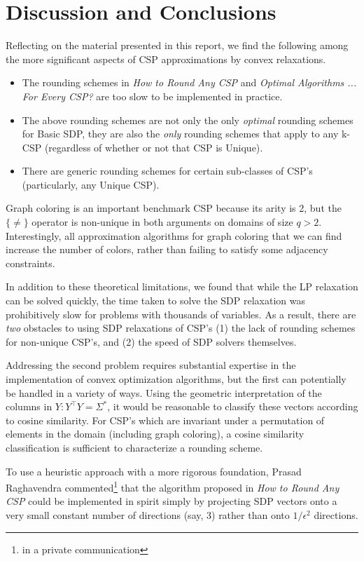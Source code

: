 \section{Discussion and Conclusions}	
	Reflecting on the material presented in this report, we find the following among the more significant aspects of CSP approximations by convex relaxations.
\begin{itemize}
\item The rounding schemes in \textit{How to Round Any CSP} and \textit{Optimal Algorithms ... For Every CSP?} are too slow to be implemented in practice.
\item The above rounding schemes are not only the only \textit{optimal} rounding schemes for Basic SDP, they are also the \textit{only} rounding schemes that apply to any k-CSP (regardless of whether or not that CSP is Unique).
\item There are generic rounding schemes for certain sub-classes of CSP's (particularly, any Unique CSP).
\end{itemize}
	
Graph coloring is an important benchmark CSP because its arity is 2, but the $\{\neq\}$ operator is non-unique in both arguments on domains of size $q > 2$. Interestingly, all approximation algorithms for graph coloring that we can find increase the number of colors, rather than failing to satisfy some adjacency constraints. 
	
	In addition to these theoretical limitations, we found that while the LP relaxation can be solved quickly, the time taken to solve the SDP relaxation was prohibitively slow for problems with thousands of variables. As a result, there are \textit{two} obstacles to using SDP relaxations of CSP's (1) the lack of rounding schemes for non-unique CSP's, and (2) the speed of SDP solvers themselves.
	
	Addressing the second problem requires substantial expertise in the implementation of convex optimization algorithms, but the first can potentially be handled in a variety of ways. Using the geometric interpretation of the columns in $Y : Y^\intercal Y = \Sigma^*$, it would be reasonable to classify these vectors according to cosine similarity. For CSP's which are invariant under a permutation of elements in the domain (including graph coloring), a cosine similarity classification is sufficient to characterize a rounding scheme. 
	
To use a heuristic approach with a more rigorous foundation, Prasad Raghavendra commented\footnote{in a private communication} that the algorithm proposed in \textit{How to Round Any CSP} could be implemented in spirit simply by projecting SDP vectors onto a very small constant number of directions (say, 3) rather than onto $1/\epsilon^2$ directions.

\iffalse
Note the following problem specific specific LP relaxations \cite{GoeWil94,Asa97,Yan94}.
\begin{itemize}
\item this thing
\item this thing as well
\item also this thing
\end{itemize}
k-SAT
graph coloring
\fi